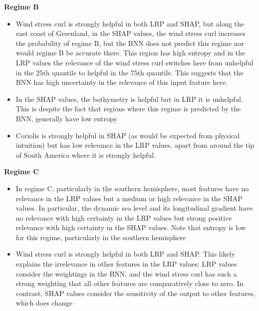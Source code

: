 \documentclass[a4paper]{article}
\begin{document}
\textbf{Regime B}
\begin{itemize}
    \item Wind stress curl is strongly helpful in both LRP and SHAP, but along the east coast of Greenland, in the SHAP values, the wind stress curl increases the probability of regime B, but the BNN does not predict this regime nor would regime B be accurate there. This region has high entropy and in the LRP values the relevance of the wind stress curl switches here from unhelpful in the 25th quantile to helpful in the 75th quantile. This suggests that the BNN has high uncertainty in the relevance of this input feature here.
    \item In the SHAP values, the bathymetry is helpful but in LRP it is unhelpful. This is despite the fact that regions where this regime is predicted by the BNN, generally have low entropy
    \item Coriolis is strongly helpful in SHAP (as would be expected from physical intuition) but has low relevance in the LRP values, apart from around the tip of South America where it is strongly helpful.
\end{itemize}

\textbf{Regime C}
\begin{itemize}
    \item In regime C, particularly in the southern hemisphere, most features have no relevance in the LRP values but a medium or high relevance in the SHAP values. In particular, the dynamic sea level and its longitudinal gradient have no relevance with high certainty in the LRP values but strong positive relevance with high certainty in the SHAP values. Note that entropy is low for this regime, particularly in the southern hemisphere 
    \item Wind stress curl is strongly helpful in both LRP and SHAP. This likely explains the irrelevance in other features in the LRP values: LRP values consider the weightings in the BNN, and the wind stress curl has such a strong weighting that all other features are comparatively close to zero. In contrast, SHAP values consider the sensitivity of the output to other features, which does change
\end{itemize}
\end{document}

